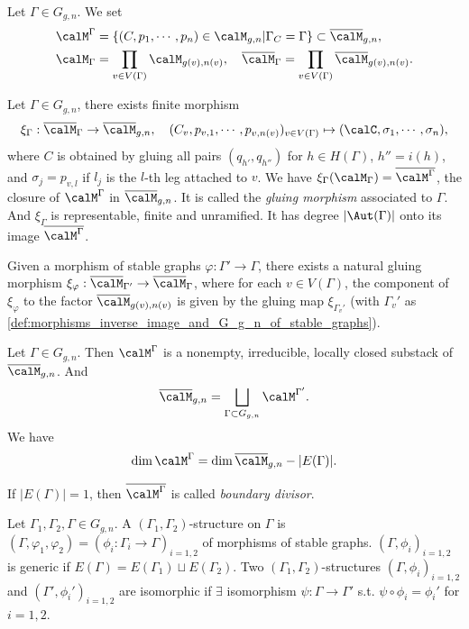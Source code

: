   \begin{definition}
  Let $\Gamma \in G_{g,n}$. 
  We set
  \begin{align*}
      \calM^\Gamma &= \{(C,p_1,\cdots,p_n) \in \calM_{g,n} | \Gamma_C = \Gamma\} \subset \overline{\calM}_{g,n}, \\
      \calM_\Gamma &= \prod_{v \in V(\Gamma)} \calM_{g(v),n(v)}, \quad
      \overline{\calM}_\Gamma = \prod_{v \in V(\Gamma)} \overline{\calM}_{g(v),n(v)}.
  \end{align*}
  \end{definition}

  Let $\Gamma \in G_{g,n}$, there exists finite morphism 
  \[ \xi_\Gamma: \overline{\calM}_\Gamma \to \overline{\calM}_{g,n},\quad (C_v,p_{v,1},\cdots,p_{v,n(v)})_{v \in V(\Gamma)} \mapsto (\calC,\sigma_1,\cdots,\sigma_n), \]
  where $C$ is obtained by gluing all pairs $(q_{h'}, q_{h''})$ for $h \in H(\Gamma)$, $h'' = i(h)$, and $\sigma_j = p_{v,l}$ if $l_j$ is the $l$-th leg attached to $v$.
  We have $\xi_\Gamma(\calM_\Gamma) = \overline{\calM^\Gamma}$, the closure of $\calM^\Gamma$ in $\overline{\calM}_{g,n}$.
  It is called the \emph{gluing morphism} associated to $\Gamma$.
  And $\xi_\Gamma$ is representable, finite and unramified.
  It has degree $|\Aut(\Gamma)|$ onto its image $\overline{\calM^\Gamma}$.

  Given a morphism of stable graphs $\varphi: \Gamma' \to \Gamma$, there exists a natural gluing morphism $\xi_\varphi: \overline{\calM}_{\Gamma'} \to \overline{\calM}_\Gamma$,
  where for each $v \in V(\Gamma)$, the component of $\xi_\varphi$ to the factor $\overline{\calM}_{g(v),n(v)}$ is given by the gluing map $\xi_{\Gamma_v'}$ (with $\Gamma_v'$ as \cref{def:morphisms_inverse_image_and_G_g_n_of_stable_graphs}).

  \begin{theorem}
    Let $\Gamma \in G_{g,n}$.
    Then $\calM^\Gamma$ is a nonempty, irreducible, locally closed substack of $\overline{\calM}_{g,n}$.
    And 
    \[ \overline{\calM}_{g,n} = \bigsqcup_{\Gamma \subset G_{g,n}} \calM^{\Gamma'}. \]
    We have 
    \[ \dim \calM^\Gamma = \dim \overline{\calM}_{g,n} - |E(\Gamma)|. \]
  \end{theorem}

  If $|E(\Gamma)| = 1$, then $\overline{\calM^\Gamma}$ is called \emph{boundary divisor}.

  \Yang{}

  Let $\Gamma_1,\Gamma_2,\Gamma \in G_{g,n}$.
  A $(\Gamma_1,\Gamma_2)$-structure on $\Gamma$ is $(\Gamma,\varphi_1,\varphi_2) = (\phi_i: \Gamma_i \to \Gamma)_{i=1,2}$ of morphisms of stable graphs.
  $(\Gamma,\phi_i)_{i=1,2}$ is generic if $E(\Gamma) = E(\Gamma_1) \sqcup E(\Gamma_2)$.
  Two $(\Gamma_1,\Gamma_2)$-structures $(\Gamma,\phi_i)_{i=1,2}$ and $(\Gamma',\phi_i')_{i=1,2}$ are isomorphic if $\exists$ isomorphism $\psi: \Gamma \to \Gamma'$ s.t. $\psi \circ \phi_i = \phi_i'$ for $i=1,2$.
  \Yang{}

